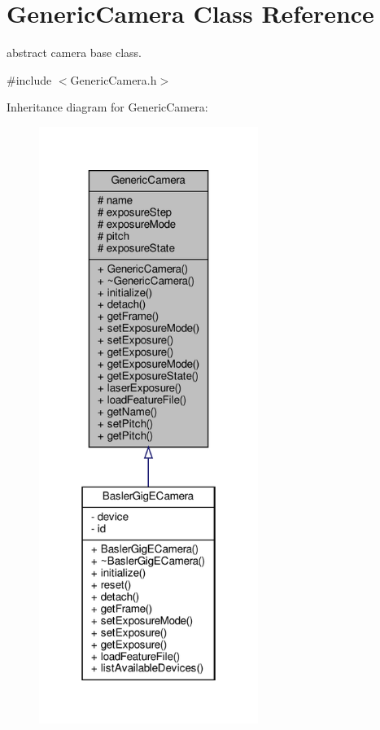 \hypertarget{class_generic_camera}{}\section{Generic\+Camera Class Reference}
\label{class_generic_camera}


abstract camera base class.  




{\ttfamily \#include $<$Generic\+Camera.\+h$>$}



Inheritance diagram for Generic\+Camera\+:
\nopagebreak
\begin{figure}[H]
\begin{center}
\leavevmode
\includegraphics[height=550pt]{class_generic_camera__inherit__graph}
\end{center}
\end{figure}


